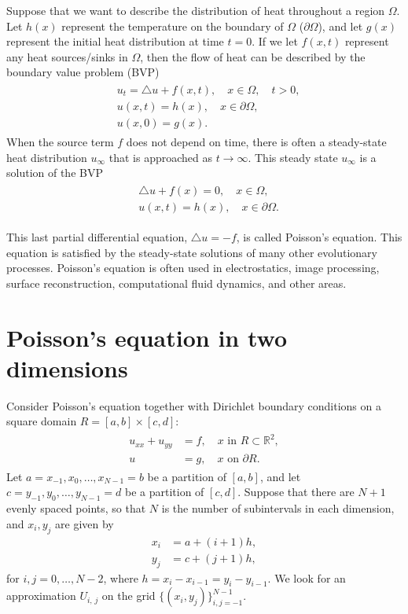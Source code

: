 \label{lab:poisson2d}
 
Suppose that we want to describe the distribution of heat throughout a region $\Omega$.
Let $h(x)$ represent the temperature on the boundary of $\Omega$ ($\partial \Omega$), and let $g(x)$ represent the initial heat distribution at time $t = 0$.
If we let $f(x,t)$ represent any heat sources/sinks in $\Omega$, then the flow of heat can be described by the boundary value problem (BVP)
\begin{align}
	\begin{split}
		& { } u_t = \triangle u + f(x,t), \quad x \in \Omega, \quad t >0,\\
		& { }u(x,t) = h(x), \quad x \in \partial \Omega, \\
		& { }u(x,0) = g(x).
	\end{split}
\end{align}
When the source term $f$ does not depend on time, there is often a steady-state heat distribution $u_{\infty}$ that is approached as $t \to \infty$.
This steady state $u_{\infty}$ is a solution of the BVP
\begin{align}
	\begin{split}
		& { }  \triangle u + f(x) = 0, \quad x \in \Omega,\\
		& { }u(x,t) = h(x), \quad x \in \partial \Omega.
	\end{split}
\end{align}

This last partial differential equation, $\triangle u = -f$, is called Poisson's equation.
This equation is satisfied by the steady-state solutions of many other evolutionary processes.
Poisson's equation is often used in electrostatics, image processing, surface reconstruction, computational fluid dynamics, and other areas. 


\section*{Poisson's equation in two dimensions}

 Consider Poisson's equation together with Dirichlet boundary conditions on a square domain $R = [a,b]\times [c,d]$:
 \begin{align}
	\begin{split}
 	u_{xx} + u_{yy} &= f,\quad x \text{ in } R \subset \mathbb{R}^2,\\
 	u &= g, \quad x \text{ on } \partial R.
	\end{split}\label{eqn:2d_poisson}
\end{align}
Let $a = x_{-1}, x_0, \ldots, x_{N-1} = b$ be a partition of $[a,b]$, and let $c = y_{-1}, y_0, \ldots, y_{N-1} = d$ be a partition of $[c,d]$.
Suppose that there are $N+1$ evenly spaced points, so that $N$ is the number of subintervals in each dimension, and $x_i, y_j$ are given by 
\begin{align*}
	x_i &= a + (i+1)h, \\
	y_j &= c + (j+1)h,
\end{align*}
for $i,j = 0, \ldots, N-2$, where $h = x_i-x_{i-1} = y_i-y_{i-1}$.
We look for an approximation $U_{i,\,j}$ on the grid $\{(x_i,y_j)\}_{i,j=-1}^{N-1}$.

